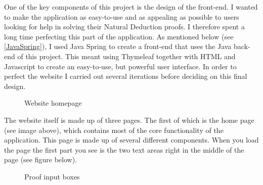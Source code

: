 One of the key components of this project is the design of the front-end. I wanted to make the application as easy-to-use and as appealing as possible to users looking for help in solving their Natural Deduction proofs. I therefore spent a long time perfecting this part of the application. As mentioned below (see \ref{JavaSpring}), I used Java Spring to create a front-end that uses the Java back-end of this project. This meant using Thymeleaf together with HTML and Javascript to create an easy-to-use, but powerful user interface. In order to perfect the website I carried out several iterations before deciding on this final design.

\begin{figure}[!ht]
	\centering
	\caption{Website homepage}
\end{figure}

The website itself is made up of three pages. The first of which is the home page (see image above), which contains most of the core functionality of the application. This page is made up of several different components. When you load the page the first part you see is the two text areas right in the middle of the page (see figure below). 

\begin{figure}[!ht]
	\centering
	\caption{Proof input boxes}
\end{figure}


